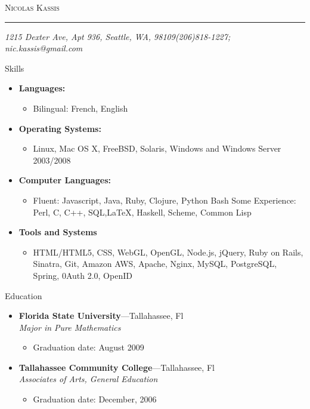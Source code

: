 \documentclass[11pt,oneside]{article}
\makeatletter
\newcommand{\name}{Nicolas Kassis}
\newcommand{\addr}{1215 Dexter Ave, Apt 936, Seattle, WA, 98109}
\newcommand{\phone}{(206)818-1227}
\newcommand{\email}{nic.kassis@gmail.com}
\newcommand{\bigname}[1]{
  \begin{center}\fontfamily{phv}\selectfont\Huge\scshape#1\end{center}
}
\newenvironment{ressection}[1]{
  \vspace{4pt}
	 {\fontfamily{phv}\selectfont\Large#1}
	 \begin{itemize}
	   \vspace{3pt}
}{
	 \end{itemize}
}
\newcommand{\resitem}[1]{
  \vspace{-4pt}
\item \begin{flushleft} #1 \end{flushleft}
}
\newcommand{\ressubitem}[1]{
  \vspace{-1pt}
\item \begin{flushleft} #1 \end{flushleft}
}
\newcommand{\resbigitem}[3]{
  \vspace{-5pt}
\item
  \textbf{#1}---#2 \\
  \textit{#3}
}
\newenvironment{ressubsec}[3]{
  \resbigitem{#1}{#2}{#3}
  \vspace{-2pt}
  \begin{itemize}
}{
  \end{itemize}
}
\newenvironment{reslist}[1]{
  \resitem{\textbf{#1}}
  \vspace{-5pt}
  \begin{itemize}
}{
  \end{itemize}
}
\makeatother
\begin{document}
 \selectfont

\bigname{\name}

\vspace{-8pt} \rule{\textwidth}{1pt}

\vspace{-1pt} {\small\itshape \addr \hfill \phone; \email}

\vspace{8 pt}

\begin{ressection}{Skills}
  \begin{reslist}{Languages:}
    \ressubitem{Bilingual: French, English}
  \end{reslist}
  \begin{reslist}{Operating Systems:}
    \ressubitem{Linux, Mac OS X, FreeBSD, Solaris, Windows and  Windows Server 2003/2008}
  \end{reslist}
  \begin{reslist}{Computer Languages:}
    \ressubitem{Fluent: Javascript, Java, Ruby, Clojure, Python Bash Some Experience: Perl, C, C++, SQL,\LaTeX, Haskell, Scheme, Common Lisp}
  \end{reslist}
  \begin{reslist}{Tools and Systems}
    \ressubitem{HTML/HTML5, CSS, WebGL, OpenGL,  Node.js, jQuery, Ruby on Rails, Sinatra, Git, Amazon AWS, Apache, Nginx, MySQL, PostgreSQL, Spring, 0Auth 2.0, OpenID}
  \end{reslist}
\end{ressection}

\begin{ressection}{Education}

  \begin{ressubsec}{Florida State University}{Tallahassee, Fl}{Major in Pure Mathematics}
    \ressubitem{Graduation date: August 2009}
  \end{ressubsec}
  \begin{ressubsec}{Tallahassee Community College}{Tallahassee, Fl}{Associates of Arts, General Education}
    \ressubitem{Graduation date: December, 2006}
  \end{ressubsec}
\end{ressection}
\end{document}
